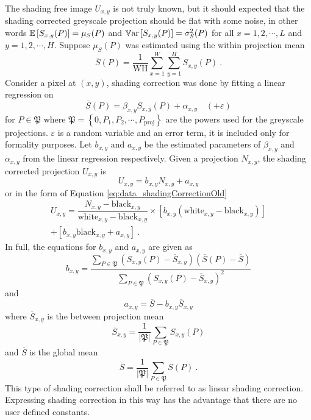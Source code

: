 The shading free image $U_{x,y}$ is not truly known, but it should expected that the shading corrected greyscale projection should be flat with some noise, in other words $\operatorname{\mathbb{E}}\left[S_{x,y}(P)\right]=\mu_{S}(P)$ and $\operatorname{\mathbb{V}ar}\left[S_{x,y}(P)\right]=\sigma_{S}^2(P)$ for all $x=1,2,\cdots,L$ and $y=1,2,\cdots,H$. Suppose $\mu_{S}(P)$ was estimated using the within projection mean
\begin{equation}
\overline{S}(P) = \dfrac{1}{\text{WH}}
\sum_{x=1}^W\sum_{y=1}^H S_{x,y}(P) \ .
\end{equation}
Consider a pixel at $(x,y)$, shading correction was done by fitting a linear regression on
\begin{equation}
\overline{S}(P) = \beta_{x,y} S_{x,y}(P) + \alpha_{x,y} \quad(+\varepsilon)
\end{equation}
for $P\in \mathfrak{P}$ where $\mathfrak{P} = \left\{0,P_1,P_2,\cdots, P_\text{proj}\right\}$ are the powers used for the greyscale projections. $\varepsilon$ is a random variable and an error term, it is included only for formality purposes. Let $b_{x,y}$ and $a_{x,y}$ be the estimated parameters of $\beta_{x,y}$ and $\alpha_{x,y}$ from the linear regression respectively. Given a projection $N_{x,y}$, the shading corrected projection $U_{x,y}$ is
\begin{equation}
U_{x,y} = b_{x,y} N_{x,y} + a_{x,y}
\end{equation}
or in the form of Equation \eqref{eq:data_shadingCorrectionOld}
\begin{multline}
U_{x,y} = \dfrac{N_{x,y}-\text{black}_{x,y}}{\text{white}_{x,y}-\text{black}_{x,y}}\times \left[b_{x,y}(\text{white}_{x,y}-\text{black}_{x,y})\right]\\+\left[b_{x,y} \text{black}_{x,y} + a_{x,y}\right] \ .
\end{multline}
In full, the equations for $b_{x,y}$ and $a_{x,y}$ are given as
\begin{equation}
b_{x,y} = \dfrac{
  \sum_{P\in\mathfrak{P}}(S_{x,y}(P) - \overline{S}_{x,y})(\overline{S}(P) - \overline{S})
}{
  \sum_{P\in\mathfrak{P}}(S_{x,y}(P) - \overline{S}_{x,y})^2
}
\end{equation}
and
\begin{equation}
a_{x,y} = \overline{S} - b_{x,y}\overline{S}_{x,y}
\end{equation}
where $\overline{S}_{x,y}$ is the between projection mean
\begin{equation}
\overline{S}_{x,y} = \dfrac{1}{|\mathfrak{P}|}\sum_{P\in\mathfrak{P}}S_{x,y}(P)
\end{equation}
and $\overline{S}$ is the global mean
\begin{equation}
\overline{S} = \dfrac{1}{|\mathfrak{P}|}\sum_{P\in\mathfrak{P}}\overline{S}(P) \ .
\end{equation}
This type of shading correction shall be referred to as linear shading correction. Expressing shading correction in this way has the advantage that there are no user defined constants.

